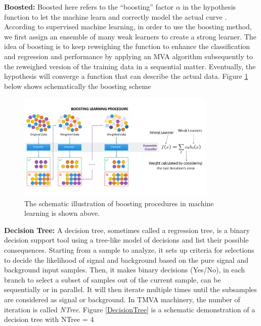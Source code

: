 \textbf{Boosted:} Boosted here refers to the ``boosting'' factor $\alpha$ in the hypothesis function to let the machine learn and correctly model the actual curve \cite{BoostingRef}. According to supervised machine learning, in order to use the boosting method, we first assign an ensemble of many weak learners to create a strong learner. The idea of boosting is to keep reweighing the function to enhance the classification and regression and performance by applying an MVA algorithm subsequently to the reweighed version of the training data in a sequential matter. Eventually, the hypothesis will converge a function that can describe the actual data. Figure \ref{Boosting} below shows schematically the boosting scheme 


\begin{figure}[h]
\begin{center}
\includegraphics[width= 0.85\textwidth]{Figures/Chapter5/Boosting.jpg}
\caption{The schematic illustration of boosting procedures in machine learning is shown above.}
\label{Boosting}
\end{center}
\end{figure}


\textbf{Decision Tree:} A decision tree, sometimes called a regression tree, is a binary decision support tool using a tree-like model of decisions and list their possible consequences. Starting from a sample to analyze, it sets up criteria for selections to decide the likelihood of signal and background based on the pure signal and background input samples. Then, it makes binary decisions (Yes/No), in each branch to select a subset of samples out of the current sample, can be sequentially or in parallel. It will then iterate multiple times until the subsamples are considered as signal or background. In TMVA machinery, the number of iteration is called \textit{NTree}. Figure \ref{DecisionTree} is a schematic demonstration of a decision tree with NTree = 4

